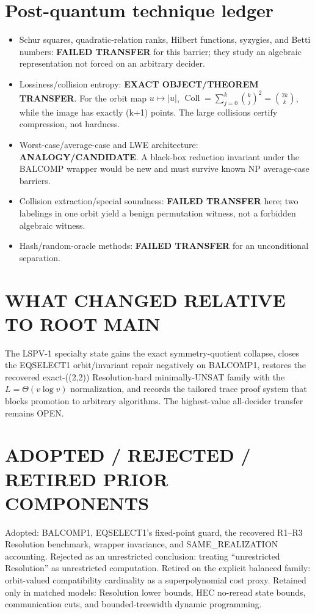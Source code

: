 \documentclass[11pt]{article}
\begin{document}
\section{Post-quantum technique ledger}
\begin{itemize}
\item Schur squares, quadratic-relation ranks, Hilbert functions, syzygies,
and Betti numbers: \textbf{FAILED TRANSFER} for this barrier; they study an
algebraic representation not forced on an arbitrary decider.
\item Lossiness/collision entropy: \textbf{EXACT OBJECT/THEOREM TRANSFER}.
For the orbit map \(u\mapsto |u|\),
\(\operatorname{Coll}=\sum_{j=0}^k\binom{k}{j}^2=\binom{2k}{k}\), while the
image has exactly (k+1) points.  The large collisions certify compression,
not hardness.
\item Worst-case/average-case and LWE architecture: \textbf{ANALOGY/CANDIDATE}.
A black-box reduction invariant under the BALCOMP wrapper would be new and
must survive known NP average-case barriers.
\item Collision extraction/special soundness: \textbf{FAILED TRANSFER} here;
two labelings in one orbit yield a benign permutation witness, not a forbidden
algebraic witness.
\item Hash/random-oracle methods: \textbf{FAILED TRANSFER} for an
unconditional separation.
\end{itemize}

\section{WHAT CHANGED RELATIVE TO ROOT MAIN}
The LSPV-1 specialty state gains the exact symmetry-quotient collapse, closes
the EQSELECT1 orbit/invariant repair negatively on BALCOMP1, restores the
recovered exact-((2,2)) Resolution-hard minimally-UNSAT family with the
\(L=\Theta(v\log v)\) normalization, and records the tailored trace proof
system that blocks promotion to arbitrary algorithms.  The highest-value
all-decider transfer remains OPEN.

\section{ADOPTED / REJECTED / RETIRED PRIOR COMPONENTS}
Adopted: BALCOMP1, EQSELECT1's fixed-point guard, the recovered R1--R3
Resolution benchmark, wrapper invariance, and SAME\_REALIZATION accounting.
Rejected as an unrestricted conclusion: treating ``unrestricted Resolution''
as unrestricted computation.  Retired on the explicit balanced family:
orbit-valued compatibility cardinality as a superpolynomial cost proxy.
Retained only in matched models: Resolution lower bounds, HEC no-reread state
bounds, communication cuts, and bounded-treewidth dynamic programming.
\end{document}
